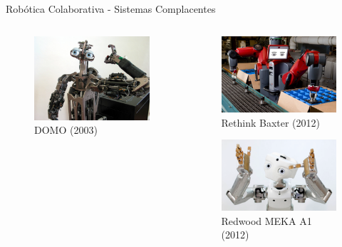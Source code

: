 \documentclass{beamer}
\begin{document}
\begin{frame}{Robótica Colaborativa - Sistemas Complacentes}
\begin{columns}
\begin{column}{0.50\textwidth}
\begin{figure}
    \centering
    \includegraphics[height = 0.5\linewidth]{tex/figs/domo-foto.jpg}
    \\{DOMO (2003)}
    \label{fig:mekainside}
\end{figure}
\end{column}
\begin{column}{0.5\textwidth}  %
\begin{figure}
    \centering
    \includegraphics[height = 0.5\linewidth]{tex/figs/baxter_production.jpg}
    \\{Rethink Baxter (2012)}
\end{figure}
\begin{figure}
    \centering
    \includegraphics[height = 0.5\linewidth]{tex/figs/meka-robot.png}
    \\{Redwood MEKA A1 (2012)}
\end{figure}
\end{column}
\end{columns}
\end{frame}
\end{document}
